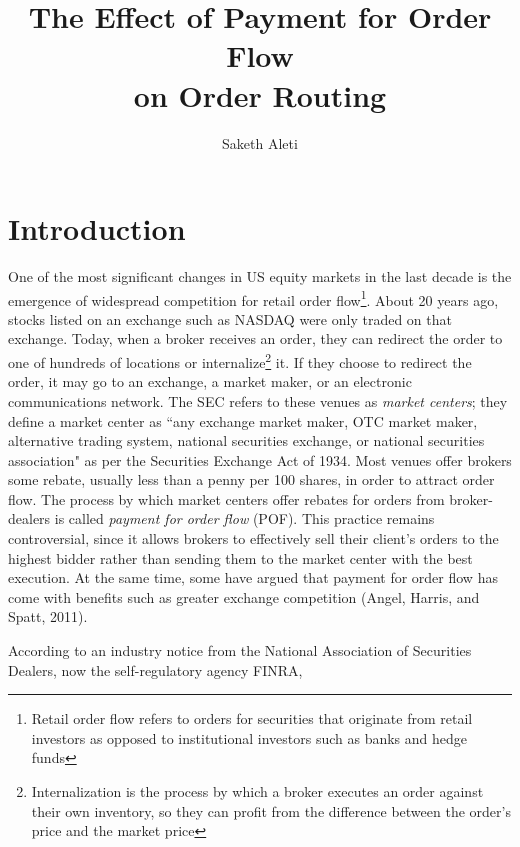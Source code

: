 \documentclass[12pt,a4paper]{article}
\begin{document}
	
\title{\textbf{The Effect of Payment for Order Flow} \\ \vspace{-0.5em} \textbf{on Order Routing}}

\author[]{Saketh Aleti}


\maketitle


\section{Introduction}	

One of the most significant changes in US equity markets in the last decade is the emergence of widespread competition for retail order flow\footnote{ Retail order flow refers to orders for securities that originate from retail investors as opposed to institutional investors such as banks and hedge funds}. About 20 years ago, stocks listed on an exchange such as NASDAQ were only traded on that exchange. Today, when a broker receives an order, they can redirect the order to one of hundreds of locations or internalize\footnote{ Internalization is the process by which a broker executes an order against their own inventory, so they can profit from the difference between the order's price and the market price} it. If they choose to redirect the order, it may go to an exchange, a market maker, or an electronic communications network. 
The SEC refers to these venues as \textit{market centers}; they define a market center as ``any exchange market maker, OTC market maker, alternative trading system, national securities exchange, or national securities association" as per the Securities Exchange Act of 1934.
Most venues offer brokers some rebate, usually less than a penny per 100 shares, in order to attract order flow.  The process by which market centers offer rebates for orders from broker-dealers is called \textit{payment for order flow} (POF). This practice remains controversial, since it allows brokers to effectively sell their client's orders to the highest bidder rather than sending them to the market center with the best execution. At the same time, some have argued that payment for order flow has come with benefits such as greater exchange competition (Angel, Harris, and Spatt, 2011). 


According to an industry notice from the National Association of Securities Dealers, now the self-regulatory agency FINRA,
\end{document}

